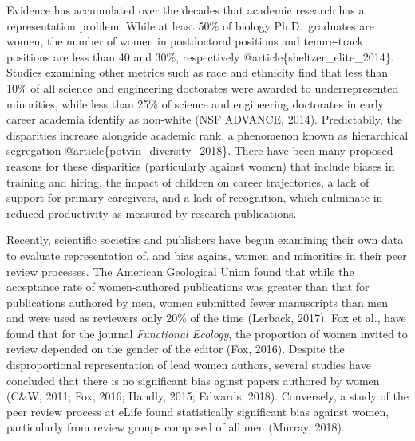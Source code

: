 \documentclass[11pt,]{article}
\begin{document}
Evidence has accumulated over the decades that academic research has a
representation problem. While at least 50\% of biology Ph.D.~graduates
are women, the number of women in postdoctoral positions and
tenure-track positions are less than 40 and 30\%, respectively
@article\{sheltzer\_elite\_2014\}. Studies examining other metrics such
as race and ethnicity find that less than 10\% of all science and
engineering doctorates were awarded to underrepresented minorities,
while less than 25\% of science and engineering doctorates in early
career academia identify as non-white (NSF ADVANCE, 2014). Predictabily,
the disparities increase alongside academic rank, a phenomenon known as
hierarchical segregation @article\{potvin\_diversity\_2018\}. There have
been many proposed reasons for these disparities (particularly against
women) that include biases in training and hiring, the impact of
children on career trajectories, a lack of support for primary
caregivers, and a lack of recognition, which culminate in reduced
productivity as measured by research publications.

Recently, scientific societies and publishers have begun examining their
own data to evaluate representation of, and bias agains, women and
minorities in their peer review processes. The American Geological Union
found that while the acceptance rate of women-authored publications was
greater than that for publications authored by men, women submitted
fewer manuscripts than men and were used as reviewers only 20\% of the
time (Lerback, 2017). Fox et al., have found that for the journal
\emph{Functional Ecology}, the proportion of women invited to review
depended on the gender of the editor (Fox, 2016). Despite the
disproportional representation of lead women authors, several studies
have concluded that there is no significant bias aginst papers authored
by women (C\&W, 2011; Fox, 2016; Handly, 2015; Edwards, 2018).
Conversely, a study of the peer review process at eLife found
statistically significant bias against women, particularly from review
groups composed of all men (Murray, 2018).
\end{document}
